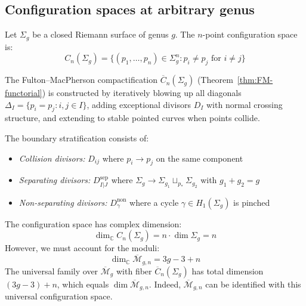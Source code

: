 \subsection{Configuration spaces at arbitrary genus}

\begin{definition}
\label{def:higher-genus-config-space}
Let $\Sigma_g$ be a closed Riemann surface of genus $g$. The $n$-point configuration space is:
\begin{equation}
C_n(\Sigma_g) = \{(p_1, \ldots, p_n) \in \Sigma_g^n : p_i \neq p_j \text{ for } i \neq j\}
\end{equation}

The Fulton--MacPherson compactification $\overline{C}_n(\Sigma_g)$ (Theorem~\ref{thm:FM-functorial}) is constructed by iteratively blowing up all diagonals $\Delta_{I} = \{p_i = p_j : i,j \in I\}$, adding exceptional divisors $D_I$ with normal crossing structure, and extending to stable pointed curves when points collide.

The boundary stratification consists of:
\begin{itemize}
\item \emph{Collision divisors:} $D_{ij}$ where $p_i \to p_j$ on the same component
\item \emph{Separating divisors:} $D_{I|J}^{\text{sep}}$ where $\Sigma_g \to \Sigma_{g_1} \sqcup_{p_*} \Sigma_{g_2}$ with $g_1 + g_2 = g$
\item \emph{Non-separating divisors:} $D_\gamma^{\text{non}}$ where a cycle $\gamma \in H_1(\Sigma_g)$ is pinched
\end{itemize}
\end{definition}

\begin{remark}
\label{rem:dimension-higher-genus}
The configuration space has complex dimension:
\begin{equation}
\dim_{\mathbb{C}} C_n(\Sigma_g) = n \cdot \dim \Sigma_g = n
\end{equation}
However, we must account for the moduli:
\begin{equation}
\dim_{\mathbb{C}} \overline{\mathcal{M}}_{g,n} = 3g - 3 + n
\end{equation}
The universal family over $\overline{\mathcal{M}}_g$ with fiber $\overline{C}_n(\Sigma_g)$ has total dimension $(3g-3) + n$, which equals $\dim \overline{\mathcal{M}}_{g,n}$. Indeed, $\overline{\mathcal{M}}_{g,n}$ can be identified with this universal configuration space.
\end{remark}

